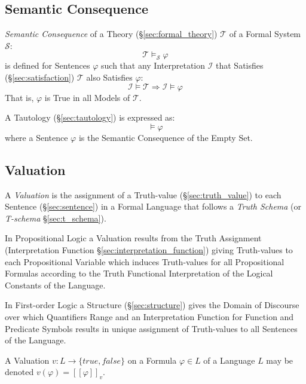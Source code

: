\subsection{Semantic Consequence}\label{sec:semantic_consequence}

\emph{Semantic Consequence} of a Theory (\S\ref{sec:formal_theory})
$\mathcal{T}$ of a Formal System $\mathcal{S}$:
\[
  \mathcal{T} \vDash_{\mathcal{S}} \varphi
\]
is defined for Sentences $\varphi$ such that any Interpretation
$\mathcal{I}$ that Satisfies (\S\ref{sec:satisfaction}) $\mathcal{T}$
also Satisfies $\varphi$:
\[
  \mathcal{I} \models \mathcal{T}
  \Rightarrow \mathcal{I} \models \varphi
\]
That is, $\varphi$ is True in all Models of $\mathcal{T}$.

A Tautology (\S\ref{sec:tautology}) is expressed as:
\[
    \vDash {\varphi}
\]
where a Sentence $\varphi$ is the Semantic Consequence of the Empty
Set.



\subsection{Valuation}\label{sec:valuation}

A \emph{Valuation} is the assignment of a Truth-value
(\S\ref{sec:truth_value}) to each Sentence (\S\ref{sec:sentence}) in a
Formal Language that follows a \emph{Truth Schema} (or \emph{T-schema}
\S\ref{sec:t_schema}).

In Propositional Logic a Valuation results from the Truth Assignment
(Interpretation Function \S\ref{sec:interpretation_function}) giving
Truth-values to each Propositional Variable which induces Truth-values
for all Propositional Formulas according to the Truth Functional
Interpretation of the Logical Constants of the Language.

In First-order Logic a Structure (\S\ref{sec:structure}) gives the
Domain of Discourse over which Quantifiers Range and an Interpretation
Function for Function and Predicate Symbols results in unique
assignment of Truth-values to all Sentences of the Language.

A Valuation $v : L \rightarrow \{true, false\}$ on a Formula $\varphi
\in L$ of a Language $L$ may be denoted $v(\varphi) = [[\varphi]]_v$.



